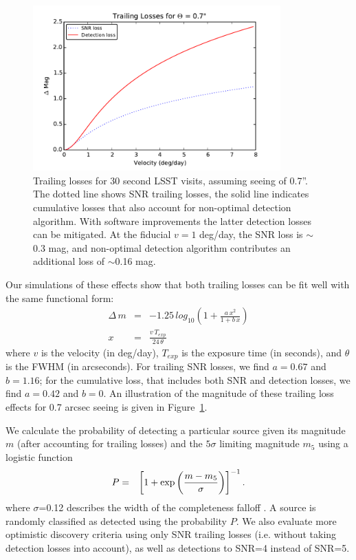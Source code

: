 \begin{figure}[t!]
\centering
\includegraphics[width=0.85\textwidth]{figures/trailing_losses}
\caption{Trailing losses for 30 second LSST visits, assuming seeing of
  0.7''. The dotted line shows SNR trailing losses, the solid line
  indicates cumulative losses that also account for non-optimal detection
  algorithm. With software improvements the latter detection losses can be
  mitigated. At the fiducial $v=1$ deg/day, the SNR loss is $\sim$0.3 mag,
  and non-optimal detection algorithm contributes an additional loss of
  $\sim$0.16 mag.
\label{fig:trailinglosses}}
\end{figure}

Our simulations of these effects show that both trailing losses can be fit well with the
same functional form:
\begin{eqnarray}
\Delta \, m & = &-1.25 \, log_{10} \left( 1 + \frac{a \, x^2} { 1 + b\,
    x} \right) \\
x & = & \frac{v \, T_{exp}} {24 \, \theta}
\end{eqnarray}
where $v$ is the velocity (in deg/day), $T_{exp}$ is the exposure time (in seconds), and $\theta$ is the FWHM (in arcseconds). For trailing SNR losses, we find $a = 0.67$ and $b = 1.16$; for the cumulative loss, that includes both SNR and detection losses,
we find $a=0.42$ and $b=0$. An illustration of the magnitude of these trailing loss effects for 0.7 arcsec seeing is given in Figure~\ref{fig:trailinglosses}.

We calculate the probability of detecting a particular source given its magnitude $m$ (after accounting for trailing losses)
and the $5\sigma$ limiting magnitude $m_5$ using a logistic function
\begin{eqnarray}
     P & = & \left[ 1 +  {\rm exp}\left(\frac {m -  m_5}{\sigma}\right) \right]^{-1}.
\end{eqnarray}
where $\sigma$=0.12 describes the width of the completeness falloff \citep{2014ApJ...794..120A}. A source is randomly classified
as detected using the probability $P$. We also evaluate more optimistic discovery criteria using only SNR trailing losses
(i.e. without taking detection losses into account), as well as detections to SNR=4 instead of SNR=5.


